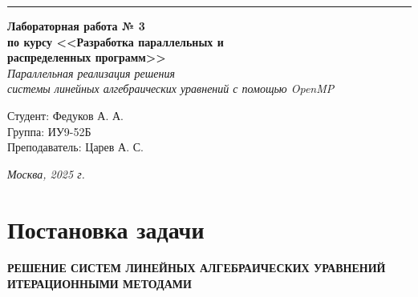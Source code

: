 \documentclass[a4paper, 14pt]{extarticle}
\begin{document}
\begin{titlepage}
\vspace*{-16pt}
\hspace{30pt}\rule{0.866\textwidth}{0.4pt}
  
\vspace{11em}

\begin{center}
\Large {\bf Лабораторная работа № 3} \\ 
\large {\bf по курсу <<Разработка параллельных и \\ распределенных программ>>} \\
\textit{Параллельная реализация решения \\ системы линейных алгебраических уравнений с помощью OpenMP}

\end{center}\normalsize

\vspace{8em}


\begin{flushright}
 \begin{minipage}{0.5\linewidth}
      {Студент: Федуков А. А. \hspace*{15pt}\\ 
      Группа: ИУ9-52Б \\ 
      Преподаватель: Царев А. С. \hspace*{15pt}}
  \end{minipage}
\end{flushright}
\bigskip
\vfill
\begin{center}
\textsl{Москва, 2025 г.}
\end{center}
\end{titlepage}

\renewcommand{\ttdefault}{pcr}

\setlength{\tabcolsep}{3pt}
\newpage
\setcounter{page}{2}

{
  \hypersetup{linkcolor=black}
  \tableofcontents
}


\section*{Постановка задачи}\label{Sect::goal}
\paragraph{РЕШЕНИЕ СИСТЕМ ЛИНЕЙНЫХ АЛГЕБРАИЧЕСКИХ УРАВНЕНИЙ ИТЕРАЦИОННЫМИ МЕТОДАМИ}
\end{document}
